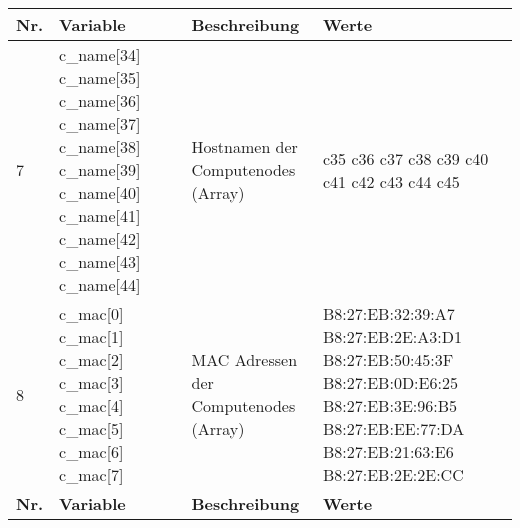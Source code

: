 \begin{longtable}{| p{0.5cm} | p{3cm} | p{8.5cm} | p{4cm} |}
\rowcolor{heading} \textbf{Nr.} & \textbf{Variable} & \textbf{Beschreibung} &\textbf{Werte} \\\hline
7 & c\_name[34] \newline c\_name[35] \newline c\_name[36] \newline c\_name[37] \newline c\_name[38] \newline c\_name[39] \newline c\_name[40] \newline c\_name[41] \newline c\_name[42] \newline c\_name[43] \newline c\_name[44] & Hostnamen der Computenodes (Array) & c35 \newline c36 \newline c37 \newline c38 \newline c39 \newline c40 \newline c41 \newline c42 \newline c43 \newline c44 \newline c45\\\hline 
8 &  c\_mac[0] \newline  c\_mac[1] \newline c\_mac[2] \newline c\_mac[3] \newline c\_mac[4] \newline c\_mac[5] \newline c\_mac[6] \newline c\_mac[7]  & MAC Adressen der Computenodes (Array) & B8:27:EB:32:39:A7 \newline B8:27:EB:2E:A3:D1 \newline B8:27:EB:50:45:3F \newline B8:27:EB:0D:E6:25 \newline B8:27:EB:3E:96:B5 \newline B8:27:EB:EE:77:DA \newline B8:27:EB:21:63:E6 \newline B8:27:EB:2E:2E:CC \\\hline 
\rowcolor{heading} \textbf{Nr.} & \textbf{Variable} & \textbf{Beschreibung} &\textbf{Werte} \\\hline

\end{longtable}
